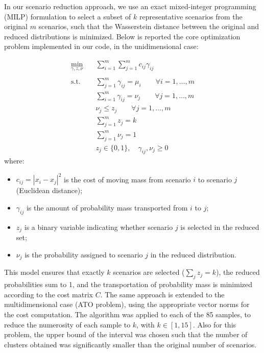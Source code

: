 \documentclass[a4paper,12pt]{article}
\begin{document}
	\noindent In our scenario reduction approach, we use an exact mixed-integer programming (MILP) formulation to select a subset of $k$ representative scenarios from the original $m$ scenarios, such that the Wasserstein distance between the original and reduced distributions is minimized. Below is reported the core optimization problem implemented in our code, in the unidimensional case:
	
	\[
	\begin{aligned}
		\min_{\gamma, z, \nu} \quad & \sum_{i=1}^m \sum_{j=1}^m c_{ij} \gamma_{ij} \\\\
		\text{s.t.} \quad
		& \sum_{j=1}^m \gamma_{ij} = \mu_i \qquad \forall i=1,\ldots,m \\
		& \sum_{i=1}^m \gamma_{ij} = \nu_j \qquad \forall j=1,\ldots,m \\
		& \nu_j \leq z_j \qquad \forall j=1,\ldots,m \\
		& \sum_{j=1}^m z_j = k \\
		& \sum_{j=1}^m \nu_j = 1 \\
		& z_j \in \{0,1\}, \quad \gamma_{ij}, \nu_j \geq 0
	\end{aligned}
	\]
	where:
	\begin{itemize}
		\item $c_{ij} = |x_i - x_j|^2$ is the cost of moving mass from scenario $i$ to scenario $j$ (Euclidean distance);
		\item $\gamma_{ij}$ is the amount of probability mass transported from $i$ to $j$;
		\item $z_j$ is a binary variable indicating whether scenario $j$ is selected in the reduced set;
		\item $\nu_j$ is the probability assigned to scenario $j$ in the reduced distribution.
	\end{itemize}
	\vspace{0.20cm}
	This model ensures that exactly $k$ scenarios are selected ($\sum_j z_j = k$), the reduced probabilities sum to 1, and the transportation of probability mass is minimized according to the cost matrix $C$. The same approach is extended to the multidimensional case (ATO problem), using the appropriate vector norms for the cost computation.
	The algorithm was applied to each of the 85 samples, to reduce the numerosity of each sample to $k$, with $k \in [1,15]$. Also for this problem, the upper bound of the interval was chosen such that the number of clusters obtained was significantly smaller than the original number of scenarios. \\
	
\end{document}
